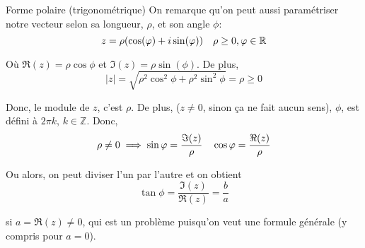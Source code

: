 \documentclass{article}
\begin{document}
\begin{parag}{Forme polaire (trigonométrique)}
    On remarque qu'on peut aussi paramétriser notre vecteur selon sa longueur, $\rho$, et son angle $\phi$:
    \[z = \rho\left(\cos\left(\phi\right) + i\sin\left(\phi\right)\right) \mathspace \rho \geq 0, \phi \in \mathbb{R}\]

    Où $\Re\left(z\right) = \rho \cos \phi$ et $\Im\left(z\right) = \rho \sin\left(\phi\right)$. De plus,
    \[\left|z\right| = \sqrt{\rho^2 \cos^2 \phi + \rho^2 \sin^2 \phi} = \rho \geq 0\]

    Donc, le module de $z$, c'est $\rho$. De plus,  ($z \neq 0$, sinon ça ne fait aucun sens), $\phi$, est défini à $2\pi k$, $k \in \mathbb{Z}$. Donc,
    \[\rho \neq 0 \implies \sin \phi = \frac{\Im\left(z\right)}{\rho} \mathspace \cos \phi = \frac{\Re\left(z\right)}{\rho}\]

    Ou alors, on peut diviser l'un par l'autre et on obtient
    \[\tan \phi = \frac{\Im\left(z\right)}{\Re\left(z\right)} = \frac{b}{a}\]

    si $a = \Re\left(z\right) \neq 0$, qui est un problème puisqu'on veut une formule générale (y compris pour $a = 0$).
\end{parag}
\end{document}
